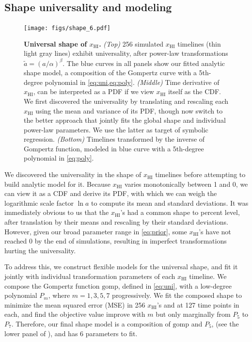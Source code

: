 \documentclass[12pt, a4paper]{article}
\newcommand{\HI}{\mathrm{HI}}
\newcommand{\ap}{\alpha}
\newcommand{\tilt}{\beta}
\newcommand{\ar}{\tilde{a}}
\newcommand{\gomp}{\mathrm{gomp}}
\begin{document}
\subsection*{Shape universality and modeling}
\label{sec:shape}

\begin{figure}[tb]
\centering
\texttt{[image: figs/shape\_6.pdf]}
\caption{\textbf{\boldmath Universal shape of $x_\HI$.}
\emph{(Top)} 256 simulated $x_\HI$ timelines (thin light gray lines)
exhibit universality, after power-law transformations $\ar =
(a/\ap)^\tilt$.
The blue curves in all panels show our fitted analytic shape model, a
composition of the Gompertz curve with a 5th-degree polynomial in
\cref{eq:uni,eq:poly}.
\emph{(Middle)} Time derivative of $x_\HI$, can be interpreted as a PDF
if we view $x_\HI$ itself as the CDF.
We first discovered the universality by translating and rescaling each
$x_\HI$ using the mean and variance of its PDF, though now switch to the
better approach that jointly fits the global shape and individual
power-law parameters.
We use the latter as target of symbolic regression.
\emph{(Bottom)} Timelines transformed by the inverse of Gompertz
function, modeled in blue curve with a 5th-degree polynomial in
\cref{eq:poly}.}
\label{fig:shape}
\end{figure}

We discovered the universality in the shape of $x_\HI$ timelines before
attempting to build analytic model for it.
Because $x_\HI$ varies monotonically between 1 and 0, we can view it as
a CDF and derive its PDF, with which we can weigh the logarithmic scale
factor $\ln a$ to compute its mean and standard deviations.
It was immediately obvious to us that the $x_\HI$'s had a common shape
to percent level, after translation by their means and rescaling by
their standard deviations.
However, given our broad parameter range in \cref{eq:prior}, some
$x_\HI$'s have not reached 0 by the end of simulations, resulting in
imperfect transformations hurting the universality.

To address this, we construct flexible models for the universal shape,
and fit it jointly with individual transformation parameters of each
$x_\HI$ timeline.
We compose the Gompertz function $\gomp$, defined in \cref{eq:uni}, with
a low-degree polynomial $P_m$, where $m = 1, 3, 5, 7$ progressively.
We fit the composed shape to minimize the mean squared error (MSE) in
256 $x_\HI$'s and at 127 time points in each, and find the objective
value improve with $m$ but only marginally from $P_5$ to $P_7$.
Therefore, our final shape model is a composition of $\gomp$ and $P_5$,
(see the lower panel of ), and has 6 parameters to fit.
\end{document}

